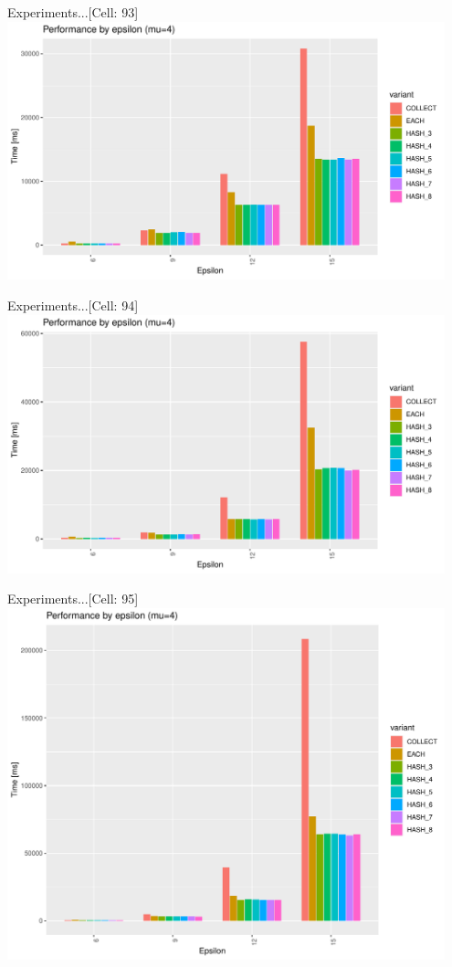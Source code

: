 \documentclass{beamer}
\begin{document}
\begin{frame}{Experiments...}{[Cell: 93]}
    \centering
    \includegraphics[width=0.95\textwidth]{figures/C_93E_15_M4} 
\end{frame}
\begin{frame}{Experiments...}{[Cell: 94]}
    \centering
    \includegraphics[width=0.95\textwidth]{figures/C_94E_15_M4} 
\end{frame}
\begin{frame}{Experiments...}{[Cell: 95]}
    \centering
    \includegraphics[width=0.95\textwidth]{figures/C_95E_15_M4} 
\end{frame}
\end{document}
